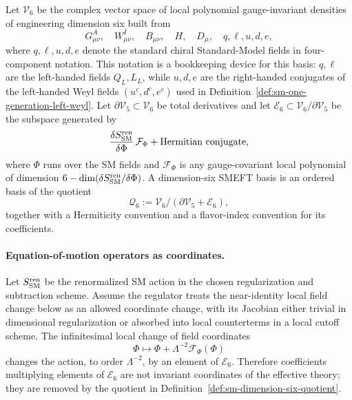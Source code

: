 \begin{definition}
\label{def:sm-dimension-six-quotient}
Let \(\mathcal V_6\) be the complex vector space of local polynomial
gauge-invariant densities of engineering dimension six built from
\[
  G^A_{\mu\nu},\quad W^I_{\mu\nu},\quad B_{\mu\nu},\quad
  H,\quad D_\mu,\quad q,\ell,u,d,e,
\]
where \(q,\ell,u,d,e\) denote the standard chiral Standard-Model fields in
four-component notation.  This notation is a bookkeeping device for this
basis: \(q,\ell\) are the left-handed fields \(Q_L,L_L\), while \(u,d,e\)
are the right-handed conjugates of the left-handed Weyl fields
\((u^c,d^c,e^c)\) used in
Definition~\ref{def:sm-one-generation-left-weyl}.  Let
\(\partial\mathcal V_5\subset\mathcal V_6\) be total derivatives and let
\(\mathcal E_6\subset\mathcal V_6/\partial\mathcal V_5\) be the subspace
generated by
\begin{equation}
  \frac{\delta S_{\rm SM}^{\rm ren}}{\delta\Phi}\,\mathcal F_\Phi
  +\text{Hermitian conjugate},
  \label{eq:sm-eom-operator-subspace}
\end{equation}
where \(\Phi\) runs over the SM fields and
\(\mathcal F_\Phi\) is any gauge-covariant local polynomial of dimension
\(6-\dim(\delta S_{\rm SM}^{\rm ren}/\delta\Phi)\).  A dimension-six
SMEFT basis is an ordered basis of the quotient
\begin{equation}
  \mathcal Q_6
  :=
  \mathcal V_6/(\partial\mathcal V_5+\mathcal E_6),
  \label{eq:sm-dimension-six-quotient}
\end{equation}
together with a Hermiticity convention and a flavor-index convention for its
coefficients.
\end{definition}

\paragraph{Equation-of-motion operators as coordinates.}
Let \(S_{\rm SM}^{\rm ren}\) be the renormalized SM action in the chosen
regularization and subtraction scheme.  Assume the regulator treats the
near-identity local field change below as an allowed coordinate change, with
its Jacobian either trivial in dimensional regularization or absorbed into
local counterterms in a local cutoff scheme.  The infinitesimal local change of
field coordinates
\begin{equation}
  \Phi\longmapsto
  \Phi+\Lambda^{-2}\mathcal F_\Phi(\Phi)
  \label{eq:sm-local-field-coordinate-change}
\end{equation}
changes the action, to order \(\Lambda^{-2}\), by an element of
\(\mathcal E_6\).  Therefore coefficients multiplying elements of
\(\mathcal E_6\) are not invariant coordinates of the effective
theory; they are removed by the quotient in
Definition~\ref{def:sm-dimension-six-quotient}.


